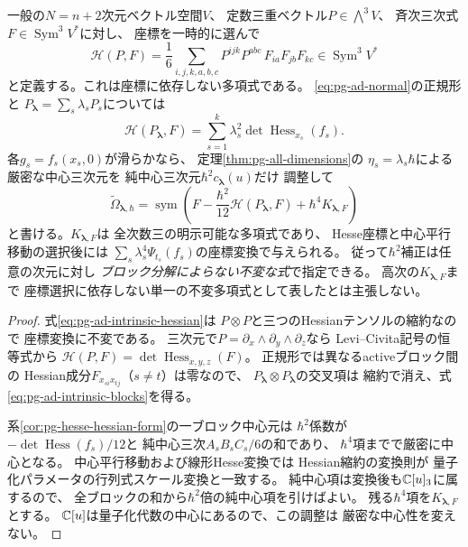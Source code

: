 \begin{proposition}[次元に依存しない内在的Hessian二次補正]
\label{prop:pg-ad-intrinsic-hessian}
一般の$N=n+2$次元ベクトル空間$V$、
定数三重ベクトル$P\in\bigwedge^3V$、
斉次三次式$F\in\operatorname{Sym}^3V^*$に対し、
座標を一時的に選んで
\begin{equation}
 \mathscr H(P,F)=
 \frac16\sum_{i,j,k,a,b,c}
 P^{ijk}P^{abc}\,
 F_{ia}F_{jb}F_{kc}\in\operatorname{Sym}^3V^*
 \label{eq:pg-ad-intrinsic-hessian}
\end{equation}
と定義する。これは座標に依存しない多項式である。
\eqref{eq:pg-ad-normal}の正規形と
$P_{\boldsymbol\lambda}=\sum_s\lambda_sP_s$については
\begin{equation}
 \mathscr H(P_{\boldsymbol\lambda},F)
 =\sum_{s=1}^k\lambda_s^2
  \det\operatorname{Hess}_{x_s}(f_s).
 \label{eq:pg-ad-intrinsic-blocks}
\end{equation}
各$g_s=f_s(x_s,0)$が滑らかなら、
定理\ref{thm:pg-all-dimensions}の
$\eta_s=\lambda_s\hbar$による厳密な中心三次元を
純中心三次元$\hbar^2c_{\boldsymbol\lambda}(u)$だけ
調整して
\begin{equation}
 \boxed{\quad
 \widetilde\Omega_{\boldsymbol\lambda,\hbar}
 =\operatorname{sym}\left(
 F-\frac{\hbar^2}{12}\mathscr H(P_{\boldsymbol\lambda},F)
 +\hbar^4K_{\boldsymbol\lambda,F}
 \right)
 \quad}
 \label{eq:pg-ad-intrinsic-center}
\end{equation}
と書ける。$K_{\boldsymbol\lambda,F}$は
全次数三の明示可能な多項式であり、
Hesse座標と中心平行移動の選択後には
$\sum_s\lambda_s^4\Psi_{t_s}(f_s)$の座標変換で与えられる。
従って$\hbar^2$補正は任意の次元に対し
\emph{ブロック分解によらない不変な式}で指定できる。
高次の$K_{\boldsymbol\lambda,F}$まで
座標選択に依存しない単一の不変多項式として表したとは主張しない。
\end{proposition}
\begin{proof}
式\eqref{eq:pg-ad-intrinsic-hessian}は
$P\otimes P$と三つのHessianテンソルの縮約なので
座標変換に不変である。
三次元で$P=\partial_x\wedge\partial_y\wedge\partial_z$なら
Levi--Civita記号の恒等式から
$\mathscr H(P,F)=\det\operatorname{Hess}_{x,y,z}(F)$。
正規形では異なるactiveブロック間の
Hessian成分$F_{x_{si}x_{tj}}$（$s\ne t$）は零なので、
$P_{\boldsymbol\lambda}\otimes P_{\boldsymbol\lambda}$の交叉項は
縮約で消え、式\eqref{eq:pg-ad-intrinsic-blocks}を得る。

系\ref{cor:pg-hesse-hessian-form}の一ブロック中心元は
$\hbar^2$係数が
$-\det\operatorname{Hess}(f_s)/12$と
純中心三次$A_sB_sC_s/6$の和であり、
$\hbar^4$項までで厳密に中心となる。
中心平行移動および線形Hesse変換では
Hessian縮約の変換則が
量子化パラメータの行列式スケール変換と一致する。
純中心項は変換後も$\mathbb C[u]_3$に属するので、
全ブロックの和から$\hbar^2$倍の純中心項を引けばよい。
残る$\hbar^4$項を$K_{\boldsymbol\lambda,F}$とする。
$\mathbb C[u]$は量子化代数の中心にあるので、この調整は
厳密な中心性を変えない。
\end{proof}

